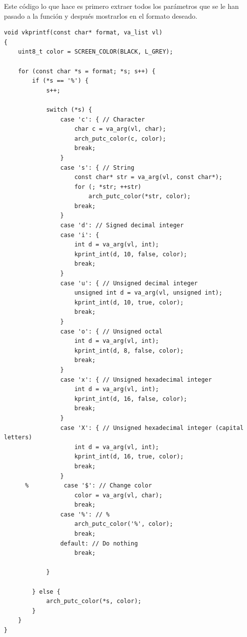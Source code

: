 \documentclass{report}
\begin{document}


Este código lo que hace es primero extraer todos los parámetros que se le han pasado a la función y después mostrarlos en el formato deseado.

\begin{lstlisting}[title=Función que imprime una cadena de caracteres]
void vkprintf(const char* format, va_list vl)
{
    uint8_t color = SCREEN_COLOR(BLACK, L_GREY);

    for (const char *s = format; *s; s++) {
        if (*s == '%') {
            s++;

            switch (*s) {
                case 'c': { // Character
                    char c = va_arg(vl, char);
                    arch_putc_color(c, color);
                    break;
                }
                case 's': { // String
                    const char* str = va_arg(vl, const char*);
                    for (; *str; ++str)
                        arch_putc_color(*str, color);
                    break;
                }
                case 'd': // Signed decimal integer
                case 'i': {
                    int d = va_arg(vl, int);
                    kprint_int(d, 10, false, color);
                    break;
                }
                case 'u': { // Unsigned decimal integer
                    unsigned int d = va_arg(vl, unsigned int);
                    kprint_int(d, 10, true, color);
                    break;
                }
                case 'o': { // Unsigned octal
                    int d = va_arg(vl, int);
                    kprint_int(d, 8, false, color);
                    break;
                }
                case 'x': { // Unsigned hexadecimal integer
                    int d = va_arg(vl, int);
                    kprint_int(d, 16, false, color);
                    break;
                }
                case 'X': { // Unsigned hexadecimal integer (capital letters)
                    int d = va_arg(vl, int);
                    kprint_int(d, 16, true, color);
                    break;
                }
      %          case '$': // Change color
                    color = va_arg(vl, char);
                    break;
                case '%': // %
                    arch_putc_color('%', color);
                    break;
                default: // Do nothing
                    break;

            }

        } else {
            arch_putc_color(*s, color);
        }
    }
}
\end{lstlisting}
\end{document}
